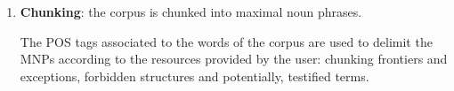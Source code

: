 \begin{enumerate}

\item \textbf{Chunking}: the corpus is chunked into maximal
  noun phrases. %

  The POS tags associated to the words of the corpus are used to delimit the MNPs
according to the resources provided by the user: chunking
frontiers and exceptions, forbidden structures and potentially, testified terms. 


\end{enumerate}
